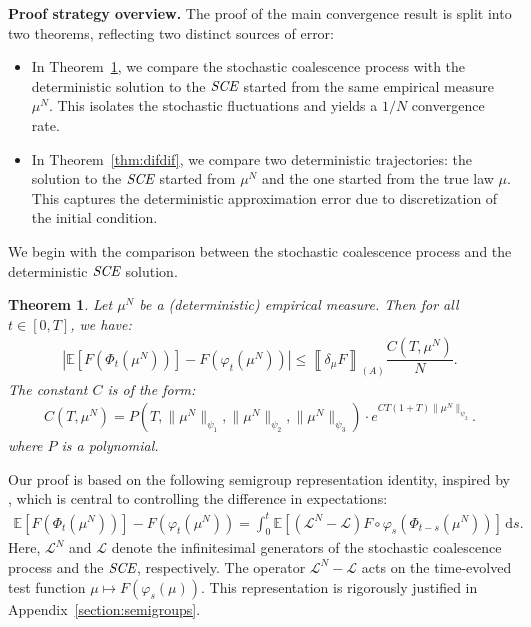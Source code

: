 \documentclass[11pt,a4paper]{article}
\newcommand{\LC}{\mathcal{L}}
\newcommand{\SCE}{\emph{SCE}}
\newcommand{\A}{(A)}
\newtheorem{theorem}{Theorem}[section]
\begin{document}
\medskip

\textbf{Proof strategy overview.} The proof of the main convergence result is split into two theorems, reflecting two distinct sources of error:

\begin{itemize}
    \item In Theorem~\ref{thm:samesame}, we compare the stochastic coalescence process with the deterministic solution to the $\SCE$ started from the same empirical measure $\mu^N$. This isolates the stochastic fluctuations and yields a $1/N$ convergence rate.
    \item In Theorem~\ref{thm:difdif}, we compare two deterministic trajectories: the solution to the $\SCE$ started from $\mu^N$ and the one started from the true law $\mu$. This captures the deterministic approximation error due to discretization of the initial condition.
\end{itemize}

We begin with the comparison between the stochastic coalescence process and the deterministic $\SCE$ solution.

\begin{theorem}\label{thm:samesame}
    Let $\mu^N$ be a (deterministic) empirical measure. Then for all $t \in [0,T]$, we have:
    \begin{align*}
        \left| \mathbb{E}\left[F\left(\Phi_t(\mu^N)\right)\right] - F\left(\varphi_t(\mu^N)\right) \right| 
        \leq \left\llbracket \delta_\mu F \right\rrbracket_{\A} \dfrac{C(T,\mu^N)}{N}.
    \end{align*}
    The constant $C$ is of the form:
    \begin{align*}
        C(T,\mu^N) = P\left(T,\|\mu^N\|_{\psi_1},\|\mu^N\|_{\psi_2},\|\mu^N\|_{\psi_3}\right) 
        \cdot e^{CT(1 + T)\|\mu^N\|_{\psi_2}}.
    \end{align*}
    where $P$ is a polynomial.
\end{theorem}

Our proof is based on the following semigroup representation identity, inspired by \cite{kolokoltsov2010central}, which is central to controlling the difference in expectations:
\begin{align}\label{eq:semi-group-relation}
    \mathbb{E}\left[F(\Phi_t(\mu^N))\right] - F(\varphi_t(\mu^N)) 
    = \int_0^t \mathbb{E}\left[\left(\LC^N - \LC\right)F\circ \varphi_s\left(\Phi_{t-s}(\mu^N)\right)\right]\, \mathrm{d}s.
\end{align}
Here, $\LC^N$ and $\LC$ denote the infinitesimal generators of the stochastic coalescence process and the $\SCE$, respectively. The operator $\LC^N - \LC$ acts on the time-evolved test function $\mu \mapsto F(\varphi_s(\mu))$. This representation is rigorously justified in Appendix~\ref{section:semigroups}.
\end{document}
